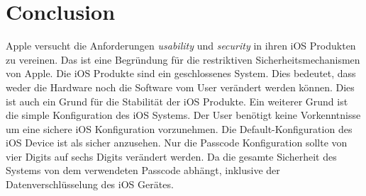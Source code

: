 %
%
%
% 

\chapter{Conclusion}
\label{ch:Conclusion}
Apple versucht die  Anforderungen \textit{\glqq usability\grqq{}} und \textit{\glqq security\grqq{}} in ihren iOS Produkten zu vereinen. Das ist eine Begründung für die restriktiven Sicherheitsmechanismen von Apple. Die iOS Produkte sind ein geschlossenes System. Dies bedeutet, dass weder die Hardware noch die Software vom User verändert werden können. Dies ist auch ein Grund für die Stabilität der iOS Produkte. Ein weiterer Grund ist die simple Konfiguration des iOS Systems. Der User benötigt keine Vorkenntnisse um eine sichere iOS Konfiguration vorzunehmen. Die Default-Konfiguration des iOS Device ist als sicher anzusehen. Nur die Passcode Konfiguration sollte von vier Digits auf sechs Digits verändert werden. Da die gesamte Sicherheit des Systems von dem verwendeten Passcode abhängt, inklusive der Datenverschlüsselung des iOS Gerätes. \par 

